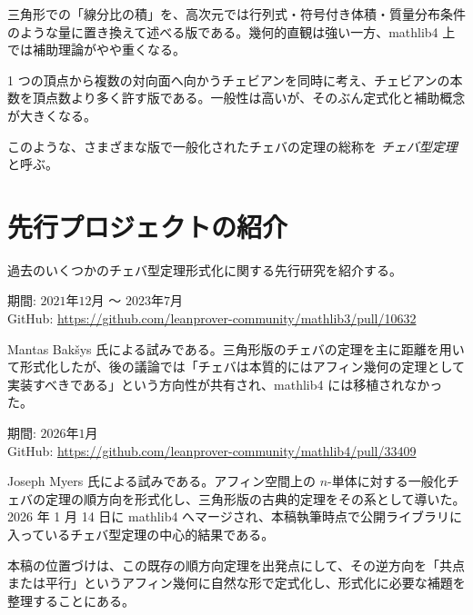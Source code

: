\documentclass[a4paper,12pt]{bxjsbook}
\newlength{\customindent}
\newenvironment{body}{
  \par
  \begingroup
  \setlength{\leftskip}{\customindent}
  \setlength{\rightskip}{0pt}
  \setlength{\parindent}{1em}
  \setlength{\displayindent}{\customindent}
  \setlength{\displaywidth}{\dimexpr\linewidth-\customindent\relax}
}{
  \par
  \endgroup
}
\theoremstyle{theorem}
\begin{document}
\begin{body}
\begin{bodydescription}
            \item[\hspace*{1.5em}・候補C：行列式・体積比による版]
            三角形での「線分比の積」を、高次元では行列式・符号付き体積・質量分布条件のような量に置き換えて述べる版である。幾何的直観は強い一方、mathlib4 上では補助理論がやや重くなる。

            \item[\hspace*{1.5em}・候補D：multipede 型の版]\cite{multipede}
            1 つの頂点から複数の対向面へ向かうチェビアンを同時に考え、チェビアンの本数を頂点数より多く許す版である。一般性は高いが、そのぶん定式化と補助概念が大きくなる。
        \end{bodydescription}

        \indent このような、さまざまな版で一般化されたチェバの定理の総称を \emph{チェバ型定理} と呼ぶ。
    \end{body}


    \section{先行プロジェクトの紹介}
    \begin{body}
        \indent 過去のいくつかのチェバ型定理形式化に関する先行研究を紹介する。

        \begin{bodydescription}
            \item[\hspace*{1.5em}・Lean3 時代の形式化]
            期間: $2021$年$12$月 〜 $2023$年$7$月\\
            GitHub: \url{https://github.com/leanprover-community/mathlib3/pull/10632} \cite{mathlib3_ceva}

            Mantas Bak\v{s}ys 氏による試みである。三角形版のチェバの定理を主に距離を用いて形式化したが、後の議論では「チェバは本質的にはアフィン幾何の定理として実装すべきである」という方向性が共有され、mathlib4 には移植されなかった。

            \item[\hspace*{1.5em}・mathlib4 における一般化版の導入]
            期間: $2026$年$1$月\\
            GitHub: \url{https://github.com/leanprover-community/mathlib4/pull/33409} \cite{mathlib4_ceva_myers}

            Joseph Myers 氏による試みである。アフィン空間上の $n$-単体に対する一般化チェバの定理の順方向を形式化し、三角形版の古典的定理をその系として導いた。2026 年 1 月 14 日に mathlib4 へマージされ、本稿執筆時点で公開ライブラリに入っているチェバ型定理の中心的結果である。
        \end{bodydescription}

        \indent 本稿の位置づけは、この既存の順方向定理を出発点にして、その逆方向を「共点または平行」というアフィン幾何に自然な形で定式化し、形式化に必要な補題を整理することにある。
    \end{body}
\end{document}
